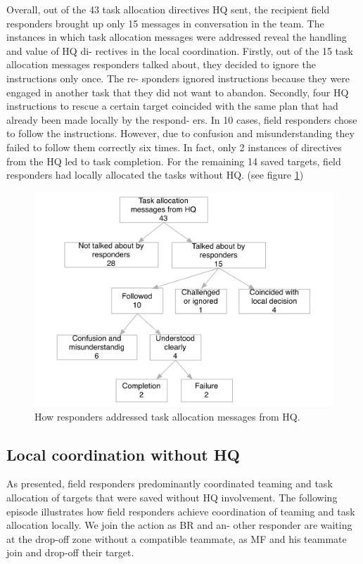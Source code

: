 Overall, out of the 43 task allocation directives HQ sent, the recipient field responders brought up only 15 messages in conversation in the team. The instances in which task allocation messages were addressed reveal the handling and value of HQ di- rectives in the local coordination. Firstly, out of the 15 task allocation messages responders talked about, they decided to ignore the instructions only once. The re- sponders ignored instructions because they were engaged in another task that they did not want to abandon. Secondly, four HQ instructions to rescue a certain target coincided with the same plan that had already been made locally by the respond- ers. In 10 cases, field responders chose to follow the instructions. However, due to confusion and misunderstanding they failed to follow them correctly six times. In fact, only 2 instances of directives from the HQ led to task completion. For the remaining 14 saved targets, field responders had locally allocated the tasks without HQ. (see figure \ref{fig:intructions})\\

\begin{figure}[h]
  \centering
  \includegraphics[width=1\textwidth]{img/study1/instructions}
  \caption{How responders addressed task allocation messages from HQ.}
  \label{fig:intructions}
\end{figure}

\subsection{Local coordination without HQ}\label{sec:s1localcoordination}
As presented, field responders predominantly coordinated teaming and task allocation of targets that were saved without HQ involvement. The following episode illustrates how field responders achieve coordination of teaming and task allocation locally. We join the action as BR and an- other responder are waiting at the drop-off zone without a compatible teammate, as MF and his teammate join and drop-off their target.\\

